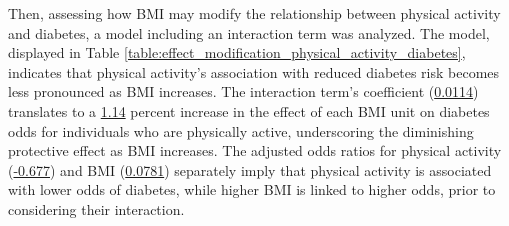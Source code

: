 \documentclass[11pt]{article}
\begin{document}
Then, assessing how BMI may modify the relationship between physical activity and diabetes, a model including an interaction term was analyzed. The model, displayed in Table \ref{table:effect_modification_physical_activity_diabetes}, indicates that physical activity's association with reduced diabetes risk becomes less pronounced as BMI increases. The interaction term's coefficient (\hyperlink{B4a}{0.0114}) translates to a \hyperlink{results4}{1.14} percent increase in the effect of each BMI unit on diabetes odds for individuals who are physically active, underscoring the diminishing protective effect as BMI increases. The adjusted odds ratios for physical activity (\hyperlink{B2a}{-0.677}) and BMI (\hyperlink{B3a}{0.0781}) separately imply that physical activity is associated with lower odds of diabetes, while higher BMI is linked to higher odds, prior to considering their interaction.
\end{document}
